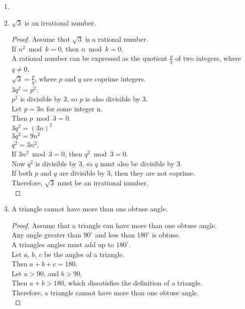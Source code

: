 \begin{enumerate}[leftmargin=2cm,labelsep=.5cm,label=\bf\arabic*.]
\item

\item
\begin{lemma}
$\sqrt{3}$ is an irrational number.
\end{lemma}
\begin{proof}
Assume that $\sqrt{3}$ is a rational number.\\
If $n^2 \bmod k = 0$, then $n \bmod k = 0$.\\
A rational number can be expressed as the quotient $\frac{p}{q}$ of two integers, where $q\neq 0$.\\[2mm]
$\sqrt{3}=\frac{p}{q}$, where $p$ and $q$ are coprime integers.\\
$3q^2 = p^2$.\\
$p^2$ is divisible by $3$, so $p$ is also divisible by $3$.\\
Let $p=3n$ for some integer n.\\
Then $p \bmod 3 = 0$.\\
$3q^2 = (3n)^2$\\
$3q^2 = 9n^2$\\
$q^2 = 3n^2$.\\
If $3n^2 \bmod 3 = 0$, then $q^2 \bmod 3 = 0$.\\[2mm]
Now $q^2$ is divisible by $3$, so $q$ must also be divisible by $3$.\\
If both $p$ and $q$ are divisible by $3$, then they are not coprime.\\
Therefore, $\sqrt{3}$ must be an irrational number.\\[5mm]
\end{proof}

\item
\begin{lemma}
A triangle cannot have more than one obtuse angle.
\end{lemma}
\begin{proof}
Assume that a triangle can have more than one obtuse angle.\\
Any angle greater than $90^{\circ}$ and less than $180^{\circ}$ is obtuse.\\
A triangles angles must add up to $180^{\circ}$.\\[2mm]
Let $a$, $b$, $c$ be the angles of a triangle.\\
Then $a + b + c = 180$.\\
Let $a > 90$, and $b > 90$.\\[2mm]
Then $a + b > 180$, which dissatisfies the definition of a triangle.\\
Therefore, a triangle cannot have more than one obtuse angle.\\[5mm]
\end{proof}
\newpage


\end{enumerate}
